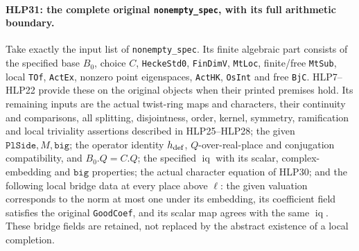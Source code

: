 \paragraph{HLP31: the complete original \texttt{nonempty\_spec}, with its full arithmetic boundary.}
\label{claim:HLP31}
Take exactly the input list of \texttt{nonempty\_spec}. Its
finite algebraic part consists of the specified base \(B_0\),
choice \(C\), \texttt{HeckeStd0}, \texttt{FinDimV}, \texttt{MtLoc},
finite/free \texttt{MtSub}, local \texttt{TOf}, \texttt{ActEx},
nonzero point eigenspaces, \texttt{ActHK}, \texttt{OsInt} and
free \texttt{BjC}. HLP7--HLP22 provide these on the original
objects when their printed premises hold. Its remaining inputs
are the actual twist-ring maps and characters, their continuity
and comparisons, all splitting, disjointness, order, kernel,
symmetry, ramification and local triviality assertions described
in HLP25--HLP28; the given \(\texttt{PlSide},M,\texttt{big}\);
the operator identity \(h_{\rm def}\), \(Q\)-over-real-place and
conjugation compatibility, and \(B_0.Q=C.Q\); the specified
\(\operatorname{iq}\) with its scalar, complex-embedding and
\(\texttt{big}\) properties; the actual character equation of
HLP30; and the following local bridge data at every place above
\(\ell\): the given valuation corresponds to the norm at most
one under its embedding, its coefficient field satisfies the
original \texttt{GoodCoef}, and its scalar map agrees with the
same \(\operatorname{iq}\). These bridge fields are retained,
not replaced by the abstract existence of a local completion.

